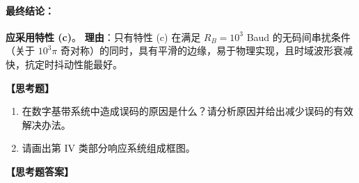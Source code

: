 \documentclass[a4paper,11pt]{ctexart}
\begin{document}
    \paragraph{最终结论：}
    \textbf{应采用特性 (c)}。
    \newline
    \textbf{理由}：只有特性 (c) 在满足 $R_B=10^3$ Baud 的无码间串扰条件（关于 $10^3\pi$ 奇对称）的同时，具有平滑的边缘，易于物理实现，且时域波形衰减快，抗定时抖动性能最好。

\vspace{1em}

\noindent \textbf{【思考题】}

\begin{enumerate}
    \item 在数字基带系统中造成误码的原因是什么？请分析原因并给出减少误码的有效解决办法。
    \item 请画出第 IV 类部分响应系统组成框图。
\end{enumerate}

\vspace{2em}

\noindent \textbf{【思考题答案】}
\end{document}
